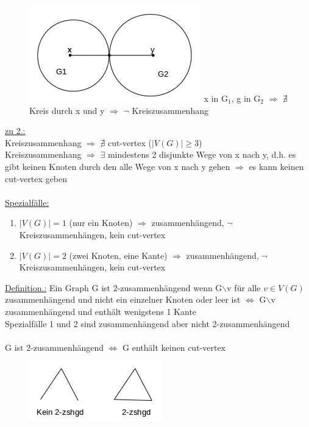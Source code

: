 \begin{figure}[htp]
\centering
\includegraphics[scale=0.9]{lectures/161021/pix/pic5.jpg}
x in G$_1$, g in G$_2$ $\Rightarrow$ $\nexists$ Kreis durch x und y $\Rightarrow$ $\neg$ Kreiszusammenhang
\end{figure}

\newpage
\underline{zu 2.:}\\
Kreiszusammenhang $\Rightarrow$ $\nexists$ cut-vertex ($|V(G)| \geq 3$)\\
Kreiszusammenhang $\Rightarrow$ $\exists$ mindestens 2 disjunkte Wege von x nach y, d.h. es gibt keinen Knoten durch den alle Wege von x nach y gehen $\Rightarrow$ es kann keinen cut-vertex geben
\\\\
\underline{Spezialfälle:}\\
\begin{enumerate}
	\item $|V(G)| = 1$ (nur ein Knoten) $\Rightarrow$ zusammenhängend, $\neg$ Kreiszusammenhängen, kein cut-vertex
	\item $|V(G)| = 2$ (zwei Knoten, eine Kante) $\Rightarrow$ zusammenhängend, $\neg$ Kreiszusammenhängen, kein cut-vertex
\end{enumerate}

\underline{Definition.:} Ein Graph G ist 2-zusammenhängend wenn G$\backslash$v für alle $v \in V(G)$ zusammenhängend und nicht ein einzelner Knoten oder leer ist $\Leftrightarrow$ G$\backslash$v zusammenhängend und enthält wenigstens 1 Kante\\

Spezialfälle 1 und 2 sind zusammenhängend aber nicht 2-zusammenhängend
\\\\
G ist 2-zusammenhängend $\Leftrightarrow$ G enthält keinen cut-vertex
\begin{figure}[htp]
\centering
\includegraphics[scale=0.9]{lectures/161021/pix/pic6.jpg}
\end{figure}

